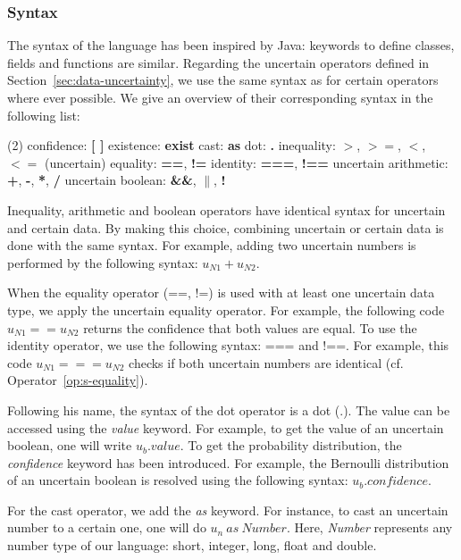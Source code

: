 \subsubsection{Syntax}
The syntax of the language has been inspired by Java: keywords to define classes, fields and functions are similar. 
Regarding the uncertain operators defined in Section~\ref{sec:data-uncertainty}, we use the same syntax as for certain operators where ever possible.
We give an overview of their corresponding syntax in the following list:
\begin{tasks}[style=itemize, after-item-skip=-1mm, before-skip={0mm}](2)
    \task confidence: \textbf{[ ]}
    \task existence: \textbf{exist}
    \task cast: \textbf{as}
    \task dot: \textbf{.}
    \task inequality: \textbf{$>$}, \textbf{$>=$}, \textbf{$<$}, \textbf{$<=$}
    \task (uncertain) equality: \textbf{==}, \textbf{!=}
    \task identity: \textbf{===}, \textbf{!==}
    \task uncertain arithmetic: \textbf{+}, \textbf{-}, \textbf{*}, \textbf{/}
    \task uncertain boolean: \textbf{\&\&}, \textbf{$\|$}, \textbf{!} 
\end{tasks}

Inequality, arithmetic and boolean operators have identical syntax for uncertain and certain data.
By making this choice, combining uncertain or certain data is done with the same syntax.
For example, adding two uncertain numbers is performed by the following syntax: $u_{N1} + u_{N2}$.

When the equality operator (==, !=) is used with at least one uncertain data type, we apply the uncertain equality operator.
For example, the following code $u_{N1} == u_{N2}$ returns the confidence that both values are equal.
To use the identity operator, we use the following syntax: === and !==.
For example, this code $u_{N1} === u_{N2}$ checks if both uncertain numbers are identical (cf. Operator~\ref{op:s-equality}).

Following his name, the syntax of the dot operator is a dot (.).
The value can be accessed using the \textit{value} keyword.
For example, to get the value of an uncertain boolean, one will write $u_b.value$.
To get the probability distribution, the \textit{confidence} keyword has been introduced.
For example, the Bernoulli distribution of an uncertain boolean is resolved using the following syntax: $u_b.confidence$.

For the cast operator, we add the \textit{as} keyword.
For instance, to cast an uncertain number to a certain one, one will do $u_n\ as\ Number$.
Here, \textit{Number} represents any number type of our language: short, integer, long, float and double.

